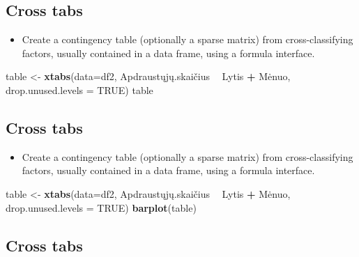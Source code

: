 \documentclass[]{article}
\newenvironment{Shaded}{\begin{snugshade}}{\end{snugshade}}
\newcommand{\KeywordTok}[1]{\textcolor[rgb]{0.13,0.29,0.53}{\textbf{#1}}}
\newcommand{\DataTypeTok}[1]{\textcolor[rgb]{0.13,0.29,0.53}{#1}}
\newcommand{\StringTok}[1]{\textcolor[rgb]{0.31,0.60,0.02}{#1}}
\newcommand{\OtherTok}[1]{\textcolor[rgb]{0.56,0.35,0.01}{#1}}
\newcommand{\OperatorTok}[1]{\textcolor[rgb]{0.81,0.36,0.00}{\textbf{#1}}}
\newcommand{\NormalTok}[1]{#1}
\providecommand{\tightlist}{%
  \setlength{\itemsep}{0pt}\setlength{\parskip}{0pt}}
\begin{document}
\subsection{Cross tabs}\label{cross-tabs-1}

\begin{itemize}
\tightlist
\item
  Create a contingency table (optionally a sparse matrix) from
  cross-classifying factors, usually contained in a data frame, using a
  formula interface.
\end{itemize}

\begin{Shaded}
\begin{Highlighting}[]
\NormalTok{table <-}\StringTok{ }\KeywordTok{xtabs}\NormalTok{(}\DataTypeTok{data=}\NormalTok{df2,}
\NormalTok{               Apdraustųjų.skaičius }\OperatorTok{~}\StringTok{ }\NormalTok{Lytis }\OperatorTok{+}\StringTok{ }\NormalTok{Mėnuo,  }
               \DataTypeTok{drop.unused.levels =} \OtherTok{TRUE}\NormalTok{)}
\NormalTok{table}
\end{Highlighting}
\end{Shaded}

\subsection{Cross tabs}\label{cross-tabs-2}

\begin{itemize}
\tightlist
\item
  Create a contingency table (optionally a sparse matrix) from
  cross-classifying factors, usually contained in a data frame, using a
  formula interface.
\end{itemize}

\begin{Shaded}
\begin{Highlighting}[]
\NormalTok{table <-}\StringTok{ }\KeywordTok{xtabs}\NormalTok{(}\DataTypeTok{data=}\NormalTok{df2,}
\NormalTok{               Apdraustųjų.skaičius }\OperatorTok{~}\StringTok{ }\NormalTok{Lytis }\OperatorTok{+}\StringTok{ }\NormalTok{Mėnuo,  }
               \DataTypeTok{drop.unused.levels =} \OtherTok{TRUE}\NormalTok{)}
\KeywordTok{barplot}\NormalTok{(table)}
\end{Highlighting}
\end{Shaded}

\subsection{Cross tabs}\label{cross-tabs-3}
\end{document}

